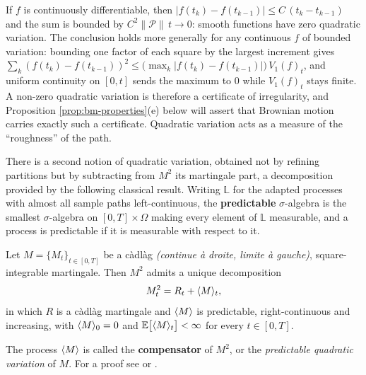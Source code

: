  If $f$ is continuously differentiable, then $|f(t_k)-f(t_{k-1})| \leq C\,(t_k - t_{k-1})$ and the sum is bounded by $C^2 \lVert\mathcal{P}\rVert \, t \to 0$: smooth functions have zero quadratic variation. The conclusion holds more generally for any continuous $f$ of bounded variation: bounding one factor of each square by the largest increment gives $\sum_k (f(t_k)-f(t_{k-1}))^2 \leq \bigl(\max_k |f(t_k)-f(t_{k-1})|\bigr)\,V_1(f)_t$, and uniform continuity on $[0,t]$ sends the maximum to $0$ while $V_1(f)_t$ stays finite. A non-zero quadratic variation is therefore a certificate of irregularity, and Proposition \ref{prop:bm-properties}(e) below will assert that Brownian motion carries exactly such a certificate. Quadratic variation acts as a measure of the ``roughness'' of the path. 
 

There is a second notion of quadratic variation, obtained not by refining partitions but by
subtracting from $M^2$ its martingale part,
a decomposition provided by the following classical result. Writing $\mathbb{L}$ for the adapted processes with almost all sample paths
left-continuous, the \textbf{predictable} $\sigma$-algebra is the smallest $\sigma$-algebra on
$[0,T]\times\Omega$ making every element of $\mathbb{L}$ measurable, and a process is predictable if
it is measurable with respect to it.

\begin{theorem}\label{thm:doobmeyer}
Let $M = \{M_t\}_{t\in[0,T]}$ be a càdlàg \emph{(continue à droite, limite à gauche)}, square-integrable martingale. Then $M^2$ admits a
unique decomposition
\begin{equation}\label{eq:compensatorannounce}
M_t^2 = R_t + \langle M \rangle_t ,
\end{equation}
in which $R$ is a càdlàg martingale and $\langle M \rangle$ is predictable, right-continuous and
increasing, with $\langle M \rangle_0 = 0$ and $\mathbb{E}\bigl[\langle M \rangle_t\bigr] < \infty$ for every $t \in [0,T]$.
\qedopen
\end{theorem}

The process $\langle M \rangle$ is called the \textbf{compensator} of $M^2$, or the \emph{predictable quadratic
variation} of $M$. For a
proof see \cite{kuo2006} or \cite{shreve2004}.

